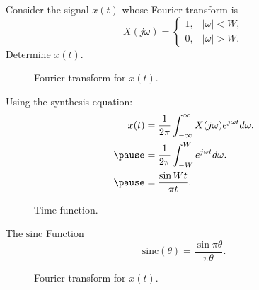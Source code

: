 \begin{frame}
    \begin{example}
        Consider the signal $x(t)$ whose Fourier transform is
        \begin{equation*}
            X(j\omega) = \begin{cases}
                1,& |\omega| < W,\\
                0, & |\omega| > W.
            \end{cases}
        \end{equation*}
        Determine $x(t)$.
        \begin{figure}
          \centering
          
          \caption{Fourier transform for $x(t)$.}\label{fi:xomega_square}
        \end{figure}
    \end{example}
    \pause
    {

    }
\end{frame}



\begin{frame}[plain]
    {

        Using the synthesis equation:
        \begin{equation*}
            \begin{aligned}
                x(t) &= \frac{1}{2\pi}\int_{-\infty}^{\infty}X(j\omega)e^{j\omega t} d\omega.\\ \pause
                &= \frac{1}{2\pi}\int_{-W}^{W}e^{j\omega t} d\omega.\\ \pause
                &= \frac{\sin W t}{\pi t}.\\
            \end{aligned}
        \end{equation*}
        \pause
        \begin{figure}
          \centering
          
          \caption{Time function.}\label{fi:rectift}
        \end{figure}
    }
\end{frame}



\begin{frame}{The $\mathrm{sinc}$ Function}
    \begin{equation}\label{eq:sinc_function}
        \mathrm{sinc}(\theta) = \frac{\sin \pi \theta}{\pi \theta}.
    \end{equation}
{
    \begin{figure}
      \centering
      
      \caption{Fourier transform for $x(t)$.}\label{fi:sinc_function}
    \end{figure}
}
\end{frame}



